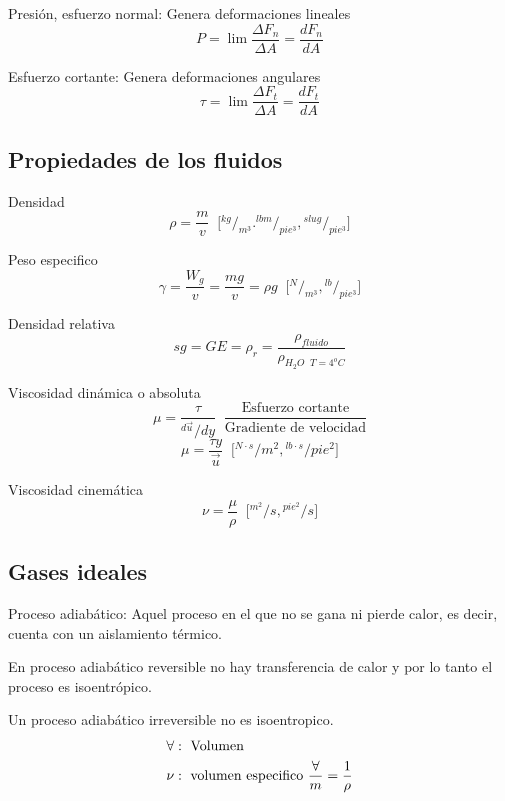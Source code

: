Presión, esfuerzo normal: Genera deformaciones lineales
\[
    P = \lim \frac{ \Delta F_{n} }{ \Delta A } = \frac{ dF_{n} }{ dA }
\]

Esfuerzo cortante: Genera deformaciones angulares 
\[
    \tau = \lim \frac{ \Delta F_{t} }{ \Delta A } = \frac{ dF_{t} }{ dA }
\]

\subsection{Propiedades de los fluidos}
Densidad 
\[ 
    \rho = \frac{ m }{ v } \;\; \Big[ {}^{ kg }/_{ m^3 }. {}^{ lbm }/_{ pie^3 }, {}^{ slug }/_{ pie^3 } \Big]
\]

Peso especifico
\[
    \gamma = \frac{ W_{g} }{ v } = \frac{ mg }{ v } = \rho g \;\; \Big[ {}^{ N }/_{ m^3 }, {}^{ lb }/_{ pie^3 } \Big]
\]

Densidad relativa 
\[
    sg = GE = \rho_{r} = \frac{ \rho_{fluido} }{ \rho_{H_{2}O \;\; T = 4^{o}C} }
\]

Viscosidad dinámica o absoluta
\[
    \mu = \frac{ \tau }{{}^{ d \Vec{u} }/{ dy }} \;\; \frac{ \text{Esfuerzo cortante} }{ \text{Gradiente de velocidad} }
\]
\[
    \mu = \frac{ \tau y }{ \Vec{u} } \;\; \Big[ {}^{N \cdot s }/{ m^{2}, {}^{ lb \cdot s }/{ pie^2 } } \Big]
\]

Viscosidad cinemática
\[
    \nu = \frac{ \mu }{ \rho } \;\; \Big[ {}^{ m^{2} }/{ s }, {}^{ pie^{2} }/{ s } \Big]
\]

\subsection{Gases ideales}

Proceso adiabático: Aquel proceso en el que no se gana ni pierde calor, es decir, cuenta con un aislamiento térmico. 

En proceso adiabático reversible no hay transferencia de calor y por lo tanto el proceso es isoentrópico.

Un proceso adiabático irreversible no es isoentropico. 
\[
    \begin{split}
        \forall & : \text{ Volumen} \\
        \nu & : \text{ volumen especifico \( \frac{ \forall }{ m } = \frac{ 1 }{ \rho } \)}
    \end{split}
\]

